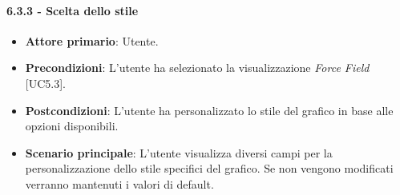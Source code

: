 \paragraph{6.3.3 - Scelta dello stile}
\begin{itemize}
	\item \textbf{Attore primario}: Utente.
	\item \textbf{Precondizioni}: L'utente ha selezionato la visualizzazione \textit{Force Field} [UC5.3].
	\item \textbf{Postcondizioni}: L'utente ha personalizzato lo stile del grafico in base alle opzioni disponibili. 
	
	\item \textbf{Scenario principale}: L'utente visualizza diversi campi per la personalizzazione dello stile specifici del grafico. Se non vengono modificati verranno mantenuti i valori di default. 
\end{itemize}